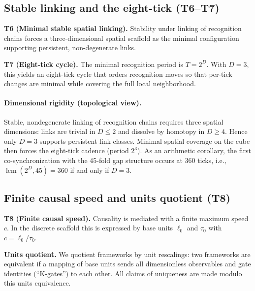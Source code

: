 \documentclass[11pt]{article}
\begin{document}
\subsection{Stable linking and the eight\mbox{-}tick (T6--T7)}
\textbf{T6 (Minimal stable spatial linking).} Stability under linking of recognition chains forces a three\mbox{-}dimensional spatial scaffold as the minimal configuration supporting persistent, non\mbox{-}degenerate links.

\textbf{T7 (Eight\mbox{-}tick cycle).} The minimal recognition period is \(T=2^D\). With \(D=3\), this yields an eight\mbox{-}tick cycle that orders recognition moves so that per\mbox{-}tick changes are minimal while covering the full local neighborhood.

\paragraph{Dimensional rigidity (topological view).} Stable, nondegenerate linking of recognition chains requires three spatial dimensions: links are trivial in \(D\le 2\) and dissolve by homotopy in \(D\ge 4\). Hence only \(D=3\) supports persistent link classes. Minimal spatial coverage on the cube then forces the eight\mbox{-}tick cadence (period \(2^3\)). As an arithmetic corollary, the first co\mbox{-}synchronization with the 45\mbox{-}fold gap structure occurs at 360 ticks, i.e., \(\operatorname{lcm}(2^D,45)=360\) if and only if \(D=3\).

\subsection{Finite causal speed and units quotient (T8)}
\textbf{T8 (Finite causal speed).} Causality is mediated with a finite maximum speed \(c\). In the discrete scaffold this is expressed by base units \(\ell_0\) and \(\tau_0\) with \(c=\ell_0/\tau_0\).

\textbf{Units quotient.} We quotient frameworks by unit rescalings: two frameworks are equivalent if a mapping of base units sends all dimensionless observables and gate identities (``K\mbox{-}gates'') to each other. All claims of uniqueness are made modulo this units equivalence.
\end{document}

